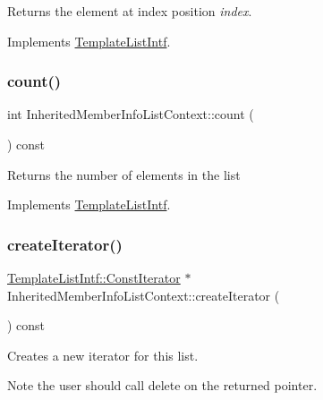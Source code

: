 Returns the element at index position {\itshape index}. 

Implements \mbox{\hyperlink{class_template_list_intf_aa51e57e72eacf4e8ce1055ee30a0f7f8}{Template\+List\+Intf}}.

\mbox{\label{class_inherited_member_info_list_context_a89313c333cec39eb147a2b61f2f5252a}} 
\subsubsection{\texorpdfstring{count()}{count()}}
{\footnotesize\ttfamily int Inherited\+Member\+Info\+List\+Context\+::count (\begin{DoxyParamCaption}{ }\end{DoxyParamCaption}) const\hspace{0.3cm}{\ttfamily [virtual]}}

Returns the number of elements in the list 

Implements \mbox{\hyperlink{class_template_list_intf_a329e49e33484c2aa5106aac1bf4e5216}{Template\+List\+Intf}}.

\mbox{\label{class_inherited_member_info_list_context_abe8fbdd088803a1973c3dcf2e62ec608}} 
\subsubsection{\texorpdfstring{createIterator()}{createIterator()}}
{\footnotesize\ttfamily \mbox{\hyperlink{class_template_list_intf_1_1_const_iterator}{Template\+List\+Intf\+::\+Const\+Iterator}} $\ast$ Inherited\+Member\+Info\+List\+Context\+::create\+Iterator (\begin{DoxyParamCaption}{ }\end{DoxyParamCaption}) const\hspace{0.3cm}{\ttfamily [virtual]}}

Creates a new iterator for this list. \begin{DoxyNote}{Note}
the user should call delete on the returned pointer. 
\end{DoxyNote}


